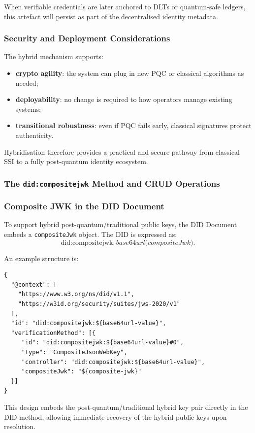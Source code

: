 \noindent
When verifiable credentials are later anchored to DLTs or quantum-safe ledgers, this artefact will persist as part of the decentralised identity metadata.

\subsubsection*{Security and Deployment Considerations}
The hybrid mechanism supports:
\begin{itemize}
    \item \textbf{crypto agility}: the system can plug in new PQC or classical algorithms as needed;
    \item \textbf{deployability}: no change is required to how operators manage existing systems;
    \item \textbf{transitional robustness}: even if PQC fails early, classical signatures protect authenticity.
\end{itemize}

\noindent
Hybridisation therefore provides a practical and secure pathway from classical SSI to a fully post-quantum identity ecosystem.




\subsubsection *{The \texttt{did:compositejwk} Method and CRUD Operations}

\subsubsection*{Composite JWK in the DID Document}
To support hybrid post-quantum/traditional public keys, the DID Document embeds a
\texttt{compositeJwk} object. The DID is expressed as:
\[
\text{did:compositejwk:}\,\textit{base64url(compositeJwk)}.
\]

\noindent
An example structure is:
\begin{verbatim}
{
  "@context": [
    "https://www.w3.org/ns/did/v1.1",
    "https://w3id.org/security/suites/jws-2020/v1"
  ],
  "id": "did:compositejwk:${base64url-value}",
  "verificationMethod": [{
     "id": "did:compositejwk:${base64url-value}#0",
     "type": "CompositeJsonWebKey",
     "controller": "did:compositejwk:${base64url-value}",
     "compositeJwk": "${composite-jwk}"
  }]
}
\end{verbatim}

\noindent
This design embeds the post-quantum/traditional hybrid key pair directly in the DID method, allowing immediate recovery of the hybrid public keys upon resolution.

